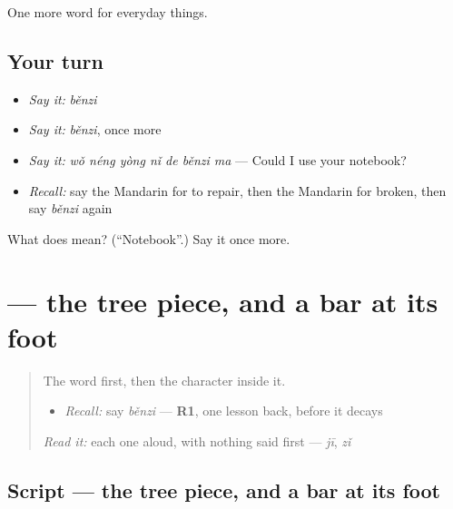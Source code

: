 \begin{grammarlens}[title={What you've built}]
One more word for everyday things.
\end{grammarlens}

\subsection*{Your turn}
\begin{itemize}
\raggedright
  \item \emph{Say it:} \emph{běnzi}
  \item \emph{Say it:} \emph{běnzi}, once more
  \item \emph{Say it:} \emph{wǒ néng yòng nǐ de běnzi ma} — Could I use your notebook?
  \item \emph{Recall:} say the Mandarin for to repair, then the Mandarin for broken, then say \emph{běnzi} again
\end{itemize}

\begin{tcolorbox}[breakable,colback=teal!4,colframe=teal!35!black,title={Before you move on}]
What does  mean? (\textquotedblleft{}Notebook\textquotedblright{}.) Say it once more.
\end{tcolorbox}
\section[\texorpdfstring{\zh{本} (běn)}{本 (běn)}]{ — the tree piece, and a bar at its foot}

\label{lesson:ZH-W104-ben}



\begin{quote}
The word first, then the character inside it.

\begin{itemize}
\raggedright
  \item \emph{Recall:} say \emph{běnzi} — \textbf{R1}, one lesson back, before it decays
\end{itemize}

\begin{quote}
 
\end{quote}

\emph{Read it:} each one aloud, with nothing said first — \emph{jī}, \emph{zǐ}
\end{quote}

\subsection*{Script — the tree piece, and a bar at its foot}

